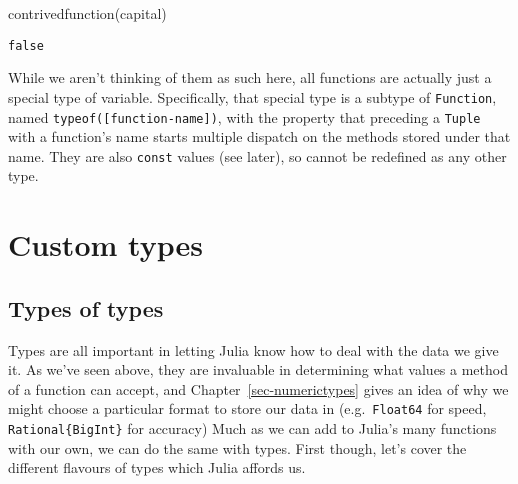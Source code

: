 \documentclass[
  letterpaper,
  DIV=11,
  numbers=noendperiod]{scrreprt}
\newenvironment{Shaded}{\begin{snugshade}}{\end{snugshade}}
\newcommand{\FunctionTok}[1]{\textcolor[rgb]{0.28,0.35,0.67}{#1}}
\newcommand{\NormalTok}[1]{\textcolor[rgb]{0.00,0.23,0.31}{#1}}
\begin{document}
\begin{Shaded}
\begin{Highlighting}[]
\FunctionTok{contrivedfunction}\NormalTok{(capital)}
\end{Highlighting}
\end{Shaded}

\begin{verbatim}
false
\end{verbatim}

\begin{tcolorbox}[enhanced jigsaw, toprule=.15mm, opacitybacktitle=0.6, leftrule=.75mm, breakable, coltitle=black, bottomrule=.15mm, colbacktitle=quarto-callout-note-color!10!white, bottomtitle=1mm, rightrule=.15mm, title=\textcolor{quarto-callout-note-color}{\faInfo}\hspace{0.5em}{Note}, colframe=quarto-callout-note-color-frame, left=2mm, colback=white, opacityback=0, arc=.35mm, toptitle=1mm, titlerule=0mm]

While we aren't thinking of them as such here, all functions are
actually just a special type of variable. Specifically, that special
type is a subtype of \texttt{Function}, named
\texttt{typeof({[}function-name{]})}, with the property that preceding a
\texttt{Tuple} with a function's name starts multiple dispatch on the
methods stored under that name. They are also \texttt{const} values (see
later), so cannot be redefined as any other type.

\end{tcolorbox}

\hypertarget{custom-types}{%
\section{Custom types}\label{custom-types}}

\hypertarget{types-of-types}{%
\subsection{Types of types}\label{types-of-types}}

Types are all important in letting Julia know how to deal with the data
we give it. As we've seen above, they are invaluable in determining what
values a method of a function can accept, and
Chapter~\ref{sec-numerictypes} gives an idea of why we might choose a
particular format to store our data in (e.g.~\texttt{Float64} for speed,
\texttt{Rational\{BigInt\}} for accuracy) Much as we can add to Julia's
many functions with our own, we can do the same with types. First
though, let's cover the different flavours of types which Julia affords
us.
\end{document}

